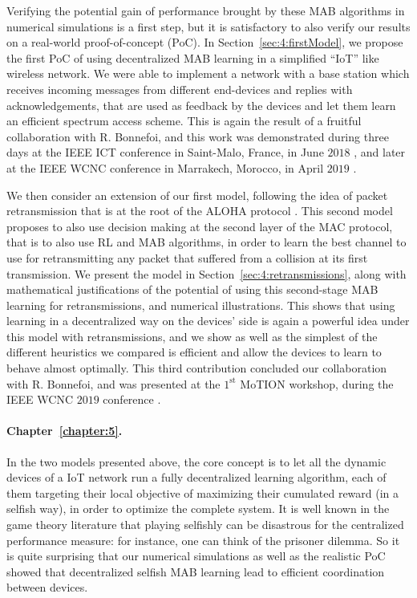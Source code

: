 Verifying the potential gain of performance brought by these MAB algorithms in numerical simulations is a first step, but it is satisfactory to also verify our results on a real-world proof-of-concept (PoC).
In Section~\ref{sec:4:firstModel}, we propose the first PoC of using decentralized MAB learning in a simplified ``IoT'' like wireless network.
We were able to implement a network with a base station which receives incoming messages from different end-devices and replies with acknowledgements, that are used as feedback by the devices and let them learn an efficient spectrum access scheme.
This is again the result of a fruitful collaboration with R. Bonnefoi, and this work was demonstrated during three days at the IEEE ICT conference in Saint-Malo, France, in June $2018$ \cite{Besson2018ICT}, and later at the IEEE WCNC conference in Marrakech, Morocco, in April $2019$ \cite{Besson2019WCNC}.

We then consider an extension of our first model, following the idea of packet retransmission that is at the root of the ALOHA protocol \cite{Abramson1970,Roberts75}.
This second model proposes to also use decision making at the second layer of the MAC protocol, that is to also use RL and MAB algorithms, in order to learn the best channel to use for retransmitting any packet that suffered from a collision at its first transmission.
We present the model in Section~\ref{sec:4:retransmissions}, along with mathematical justifications of the potential of using this second-stage MAB learning for retransmissions, and numerical illustrations.
This shows that using learning in a decentralized way on the devices' side is again a powerful idea under this model with retransmissions, and we show as well as the simplest of the different heuristics we compared is efficient and allow the devices to learn to behave almost optimally.
This third contribution concluded our collaboration with R. Bonnefoi, and was presented at the $1^{\text{st}}$ MoTION workshop, during the IEEE WCNC $2019$ conference \cite{Bonnefoi2019WCNC}.


\paragraph{Chapter~\ref{chapter:5}.}
%
In the two models presented above, the core concept is to let all the dynamic devices of a IoT network run a fully decentralized learning algorithm,
each of them targeting their local objective of maximizing their cumulated reward (in a selfish way), in order to optimize the complete system.
It is well known in the game theory literature that playing selfishly can be disastrous for the centralized performance measure: for instance, one can think of the prisoner dilemma.
So it is quite surprising that our numerical simulations as well as the realistic PoC showed that decentralized selfish MAB learning lead to efficient coordination between devices.

